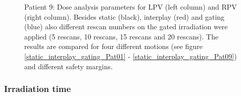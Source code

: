 \documentclass[type=dr, dr=rernat, accentcolor=tud7b,colorbacktitle, bigchapter, openright, twoside, 12pt ]{tudthesis}
\begin{document}
\begin{figure}[H]
{ }
\caption{Patient 9: Dose analysis parameters for LPV (left column) and RPV (right column). Besides static (black), interplay (red) and gating 
(blue) also different rescan numbers on the gated irradiation were applied (5 rescans, 10 rescans, 15 rescans and 20 rescans). The results
are compared for four different motions (see figure \ref{static_interplay_gating_Pat01} - \ref{static_interplay_gating_Pat09}) and different 
safety margins.}
\label{static_interplay_gating_rescan_Pat09}
\end{figure}



\newpage

\subsubsection{Irradiation time}

% 
\end{document}
